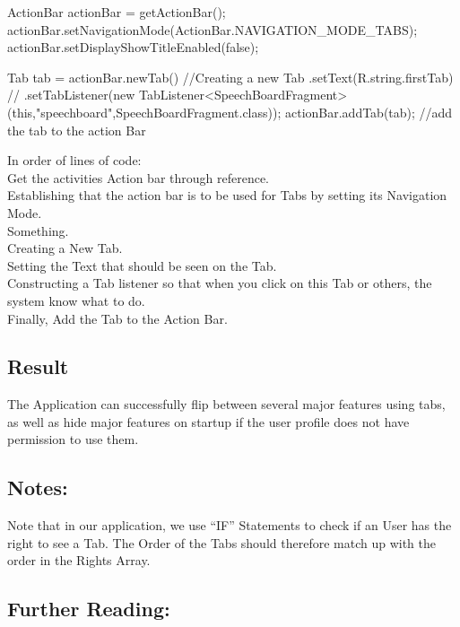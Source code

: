 \begin{source}{}
		ActionBar actionBar = getActionBar();
		actionBar.setNavigationMode(ActionBar.NAVIGATION_MODE_TABS); 
		actionBar.setDisplayShowTitleEnabled(false);
		
		Tab tab = actionBar.newTab() //Creating a new Tab
				.setText(R.string.firstTab) //
				.setTabListener(new TabListener<SpeechBoardFragment>(this,"speechboard",SpeechBoardFragment.class));
		actionBar.addTab(tab); //add the tab to the action Bar
\end{source}
In order of lines of code:\\
Get the activities Action bar through reference.\\
Establishing that the action bar is to be used for Tabs by setting its Navigation Mode.\\
Something.\\
Creating a New Tab.\\
Setting the Text that should be seen on the Tab.\\
Constructing a Tab listener so that when you click on this Tab or others, the system know what to do.\\
Finally, Add the Tab to the Action Bar.\\

\subsection{Result}
The Application can successfully flip between several major features using tabs, as well as hide major features on startup if the user profile does not have permission to use them.

\subsection{Notes:}
Note that in our application, we use ``IF'' Statements to check if an User has the right to see a Tab.
The Order of the Tabs should therefore match up with the order in the Rights Array.

\subsection{Further Reading:}
